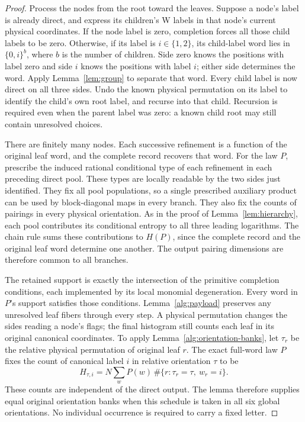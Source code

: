 \documentclass[11pt]{article}
\numberwithin{equation}{section}
\theoremstyle{definition}
\theoremstyle{remark}
\begin{document}
\begin{proof}
Process the nodes from the root toward the leaves.  Suppose a node's label
is already direct, and express its children's W labels in that node's
current physical coordinates.  If the node label is zero, completion
forces all those child labels to be zero.  Otherwise, if its label is
\(i\in\{1,2\}\), its child-label word lies in \(\{0,i\}^b\), where
\(b\) is the number of children.  Side zero knows the positions with label
zero and side \(i\) knows the positions with label \(i\); either side
determines the word.  Apply Lemma~\ref{lem:group} to separate that word.
Every child label is now direct on all three sides.  Undo the known
physical permutation on its label to identify the child's own root label,
and recurse into that child.  Recursion is required even when the parent
label was zero: a known child root may still contain unresolved choices.

There are finitely many nodes.  Each successive refinement is a function
of the original leaf word, and the complete record recovers that word.
For the law \(P\), prescribe the induced rational conditional type of
each refinement in each preceding direct pool.  These types are locally
readable by the two sides just identified.  They fix all pool populations,
so a single prescribed auxiliary product can be used by block-diagonal
maps in every branch.  They also fix the counts of pairings in every
physical orientation.  As in the proof of Lemma~\ref{lem:hierarchy}, each
pool contributes its conditional entropy to all three leading logarithms.
The chain rule sums these contributions to \(H(P)\), since the complete
record and the original leaf word determine one another.  The output
pairing dimensions are therefore common to all branches.

The retained support is exactly the intersection of the primitive
completion conditions, each implemented by its local monomial
degeneration.  Every word in \(P\)'s support satisfies those conditions.
Lemma~\ref{alg:payload} preserves any unresolved leaf fibers through every
step.  A physical permutation changes the sides reading a node's flags;
the final histogram still counts each leaf in its original canonical
coordinates.  To apply Lemma~\ref{alg:orientation-banks}, let \(\tau_r\)
be the relative physical permutation of original leaf \(r\).  The exact
full-word law \(P\) fixes the count of canonical label \(i\) in relative
orientation \(\tau\) to be
\[
 H_{\tau,i}
 =N\sum_w P(w)\,
       \#\{r:\tau_r=\tau,\ w_r=i\}.
\]
These counts are independent of the direct output.  The lemma therefore
supplies equal original orientation banks when this schedule is taken in
all six global orientations.  No individual occurrence is required to carry
a fixed letter.
\end{proof}
\end{document}
